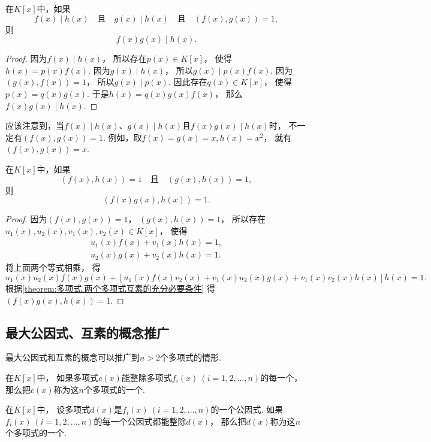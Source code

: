 \begin{property}\label{theorem:多项式.互素.性质2}
在\(K[x]\)中，如果\[
	f(x) \mid h(x)
	\quad\text{且}\quad
	g(x) \mid h(x)
	\quad\text{且}\quad
	(f(x),g(x))=1,
\]
则\[
	f(x) g(x) \mid h(x).
\]
\begin{proof}
因为\(f(x) \mid h(x)\)，
所以存在\(p(x) \in K[x]\)，
使得\(h(x) = p(x) f(x)\).
因为\(g(x) \mid h(x)\)，
所以\(g(x) \mid p(x) f(x)\).
因为\((g(x),f(x))=1\)，
所以\(g(x) \mid p(x)\).
因此存在\(q(x) \in K[x]\)，
使得\(p(x) = q(x) g(x)\).
于是\(h(x) = q(x) g(x) f(x)\)，
那么\(f(x) g(x) \mid h(x)\).
\end{proof}
\end{property}
应该注意到，当\(f(x) \mid h(x)\)、\(g(x) \mid h(x)\)且\(f(x) g(x) \mid h(x)\)时，
不一定有\((f(x),g(x))=1\).
例如，取\(f(x)=g(x)=x,h(x)=x^2\)，
就有\((f(x),g(x))=x\).

\begin{property}\label{theorem:多项式.互素.性质3}
在\(K[x]\)中，如果\[
	(f(x),h(x))=1
	\quad\text{且}\quad
	(g(x),h(x))=1,
\]
则\[
	(f(x) g(x),h(x))=1.
\]
\begin{proof}
因为\((f(x),g(x))=1\)，
\((g(x),h(x))=1\)，
所以存在\(u_1(x),u_2(x),v_1(x),v_2(x) \in K[x]\)，
使得\begin{gather*}
	u_1(x) f(x) + v_1(x) h(x) = 1, \\
	u_2(x) g(x) + v_2(x) h(x) = 1.
\end{gather*}
将上面两个等式相乘，
得\[
	u_1(x) u_2(x) f(x) g(x)
	+ [
		u_1(x) f(x) v_2(x)
		+ v_1(x) u_2(x) g(x)
		+ v_1(x) v_2(x) h(x)
	] h(x)
	= 1.
\]
根据\cref{theorem:多项式.两个多项式互素的充分必要条件}
得\((f(x) g(x),h(x))=1\).
\end{proof}
\end{property}

\subsection{最大公因式、互素的概念推广}
最大公因式和互素的概念可以推广到\(n>2\)个多项式的情形.
\begin{definition}
在\(K[x]\)中，
如果多项式\(c(x)\)能整除多项式\(f_i(x)\ (i=1,2,\dotsc,n)\)的每一个，
那么把\(c(x)\)称为这\(n\)个多项式的一个.
\end{definition}

\begin{definition}
在\(K[x]\)中，
设多项式\(d(x)\)是\(f_i(x)\ (i=1,2,\dotsc,n)\)的一个公因式.
如果\(f_i(x)\ (i=1,2,\dotsc,n)\)的每一个公因式都能整除\(d(x)\)，
那么把\(d(x)\)称为这\(n\)个多项式的一个.
\end{definition}

